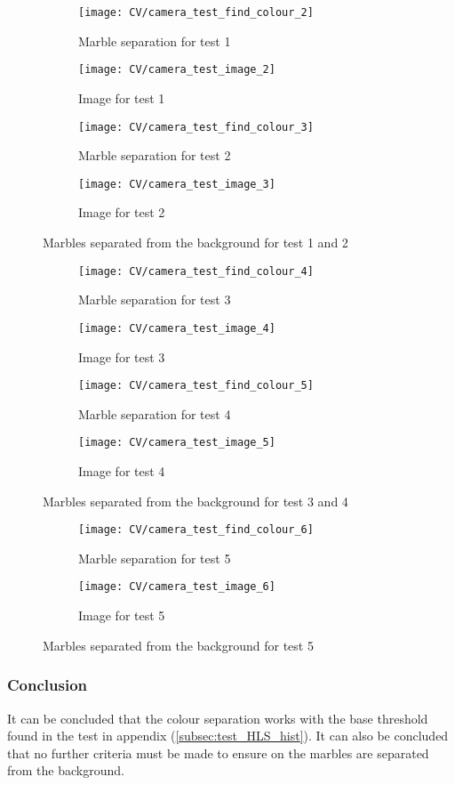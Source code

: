 \documentclass[../Head/Main.tex]{subfiles}
\begin{document}
\begin{figure}[H]
	\centering
	\begin{subfigure}[b]{0.245\textwidth}
		\centering
		\texttt{[image: CV/camera\_test\_find\_colour\_2]}
		\caption{Marble separation for test 1}
	\end{subfigure}
	\hfill
	\begin{subfigure}[b]{0.245\textwidth}
		\centering
		\texttt{[image: CV/camera\_test\_image\_2]}
		\caption{Image for test 1}
	\end{subfigure}
	\hfill 
	\begin{subfigure}[b]{0.245\textwidth}
		\centering
		\texttt{[image: CV/camera\_test\_find\_colour\_3]}
		\caption{Marble separation for test 2}
	\end{subfigure}
	\hfill
	\begin{subfigure}[b]{0.245\textwidth}
		\centering
		\texttt{[image: CV/camera\_test\_image\_3]}
		\caption{Image for test 2}
	\end{subfigure}
	\caption{Marbles separated from the background for test 1 and 2}
\end{figure}

\begin{figure}[H]
	\centering
	\begin{subfigure}[b]{0.245\textwidth}
		\centering
		\texttt{[image: CV/camera\_test\_find\_colour\_4]}
		\caption{Marble separation for test 3}
	\end{subfigure}
	\hfill
	\begin{subfigure}[b]{0.245\textwidth}
		\centering
		\texttt{[image: CV/camera\_test\_image\_4]}
		\caption{Image for test 3}
	\end{subfigure}
	\hfill 
	\begin{subfigure}[b]{0.245\textwidth}
		\centering
		\texttt{[image: CV/camera\_test\_find\_colour\_5]}
		\caption{Marble separation for test 4}
	\end{subfigure}
	\hfill
	\begin{subfigure}[b]{0.245\textwidth}
		\centering
		\texttt{[image: CV/camera\_test\_image\_5]}
		\caption{Image for test 4}
	\end{subfigure}
	\caption{Marbles separated from the background for test 3 and 4}
\end{figure}

\begin{figure}[H]
	\centering
	\begin{subfigure}[b]{0.49\textwidth}
		\centering
		\texttt{[image: CV/camera\_test\_find\_colour\_6]}
		\caption{Marble separation for test 5}
	\end{subfigure}
	\hfill
	\begin{subfigure}[b]{0.49\textwidth}
		\centering
		\texttt{[image: CV/camera\_test\_image\_6]}
		\caption{Image for test 5}
	\end{subfigure}
	\caption{Marbles separated from the background for test 5}
\end{figure}

\subsubsection*{Conclusion}
It can be concluded that the colour separation works with the base threshold found in the test in appendix (\ref{subsec:test_HLS_hist}). It can also be concluded that no further criteria must be made to ensure on the marbles are separated from the background.
\end{document}
